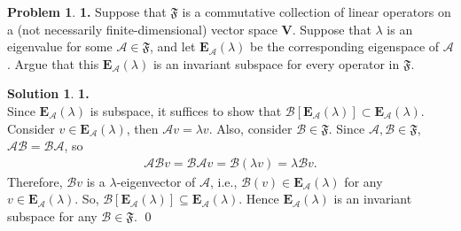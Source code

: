 \documentclass{article}
\theoremstyle{definition}
\newtheorem*{prob*}{Problem}
\newtheorem*{sln*}{Solution}
\newcommand{\V}{\mathbf{V}}
\newcommand{\A}{\mathcal{A}}
\newcommand{\FF}{\mathfrak{F}}
\begin{document}
\begin{prob*}\textbf{1.} Suppose that $\mathfrak{F}$ is a commutative collection of linear operators on a (not necessarily finite-dimensional) vector space $\V$. Suppose that $\lambda$ is an eigenvalue for some $\A \in \mathfrak{F}$, and let $\mathbf{E}_\A(\lambda)$ be the corresponding eigenspace of $\A$. Argue that this $\mathbf{E}_\A(\lambda)$ is an invariant subspace for every operator in $\mathfrak{F}$.\\
	
	\begin{sln*}\textbf{1.} \\
		
		Since $\textbf{E}_\A(\lambda)$ is subspace, it suffices to show that $\mathcal{B}[\textbf{E}_\A(\lambda)] \subset \textbf{E}_\A(\lambda) $.\\
				
		Consider $v \in \textbf{E}_\A(\lambda)$, then $\A v = \lambda v$. Also, consider $\mathcal{B} \in \FF$. Since $\A, \mathcal{B} \in \FF$, $\A \mathcal{B} = \mathcal{B} \A$, so
		\begin{align*}
		\A \mathcal{B} v = \mathcal{B}\A v = \mathcal{B} (\lambda v) = \lambda \mathcal{B}v.
		\end{align*}
		Therefore, $\mathcal{B}v$ is a $\lambda$-eigenvector of $\A$, i.e., $\mathcal{B}(v) \in \textbf{E}_\A(\lambda)$ for any $v \in \textbf{E}_\A(\lambda)$. So, $\mathcal{B}[\textbf{E}_\A(\lambda)] \subseteq \textbf{E}_\A(\lambda)$. Hence $\textbf{E}_\A(\lambda)$ is an invariant subspace for any $\mathcal{B}\in \FF$. \qed
		
	\end{sln*}
	
\end{prob*}

\newpage
\end{document}
